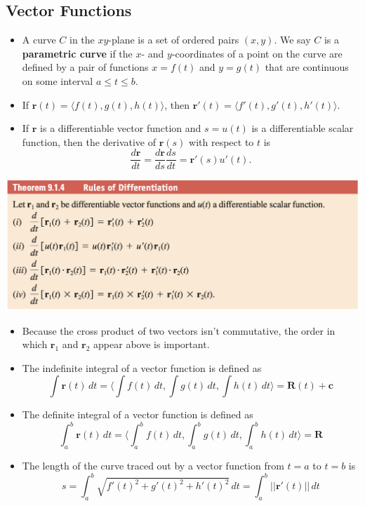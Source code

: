 \documentclass{article}
\begin{document}
\subsection{Vector Functions}

\begin{itemize}
  \item A curve $C$ in the $xy$-plane is a set of ordered pairs $(x, y)$. We say $C$ is a \textbf{parametric curve} if the $x$- and $y$-coordinates of a point on the curve are defined by a pair of functions $x = f(t)$ and $y = g(t)$ that are continuous on some interval $a \le t \le b$.

  \item If $\mathbf{r}(t) = \langle f(t), g(t), h(t) \rangle$, then $\mathbf{r}'(t) = \langle f'(t), g'(t), h'(t) \rangle$.

  \item If $\mathbf{r}$ is a differentiable vector function and $s = u(t)$ is a differentiable scalar function, then the derivative of $\mathbf{r}(s)$ with respect to $t$ is \[\frac{d \mathbf{r}}{d t} = \frac{d \mathbf{r}}{d s} \frac{d s}{d t} = \mathbf{r}'(s) u'(t).\]
\end{itemize}

\includegraphics[scale=0.443]{vector-differentiation}

\begin{itemize}
  \item Because the cross product of two vectors isn't commutative, the order in which $\mathbf{r}_1$ and $\mathbf{r}_2$ appear above is important.

  \item The indefinite integral of a vector function is defined as \[\int \mathbf{r}(t) \,dt = \langle \int f(t) \,dt, \int g(t) \,dt, \int h(t) \,dt \rangle = \mathbf{R}(t) + \mathbf{c}\]

  \item The definite integral of a vector function is defined as \[\int_a^b \mathbf{r}(t) \,dt = \langle \int_a^b f(t) \,dt, \int_a^b g(t) \,dt, \int_a^b h(t) \,dt \rangle = \mathbf{R}\]

  \item The length of the curve traced out by a vector function from $t = a$ to $t = b$ is \[s = \int_a^b \sqrt{f'(t)^2 + g'(t)^2 + h'(t)^2} \,dt = \int_a^b ||\mathbf{r}'(t)|| \,dt\]
\end{itemize}
\end{document}
